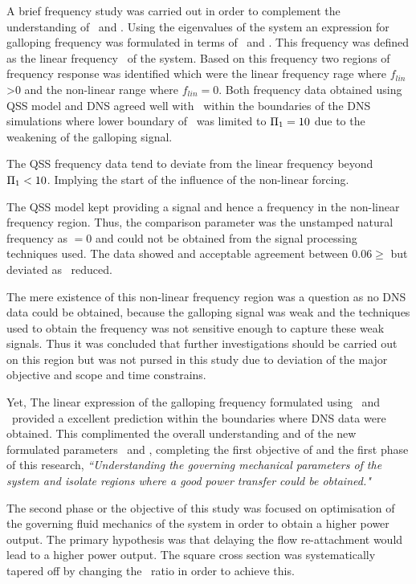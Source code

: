  A brief frequency study was carried out in order to complement the understanding of \massstiff\ and \massdamp. Using the eigenvalues of the system an expression for galloping frequency was formulated in terms of \massstiff\ and \massdamp. This frequency was defined as the linear frequency \freqlin\ of the system. Based on this frequency two regions of frequency response was identified which were the linear frequency rage where $f_{lin}$>0 and the non-linear range where $f_{lin}=0$. Both frequency data obtained using QSS model and DNS agreed well with \freqlin\ within the boundaries of the DNS simulations where lower boundary of \massstiff\ was limited to $\Pi_1=10$ due to the weakening of the galloping signal.
 
 The QSS frequency data tend to deviate from the linear frequency beyond $\Pi_1<10$. Implying the start of the influence of the non-linear forcing. 
 
 The QSS model kept providing a signal and hence a frequency in the non-linear frequency region. Thus, the comparison parameter was the unstamped natural frequency as \freqlin$=0$ and \freqdns could not be obtained from the signal processing techniques used. The data showed and acceptable agreement between $0.06\geq$ but deviated as \massstiff\ reduced.
 
 The mere existence of this non-linear frequency region was a question as no DNS data could be obtained, because the galloping signal was weak and the techniques used to obtain the  frequency was not sensitive enough to capture these weak signals. Thus it was concluded that further investigations should be carried out on this region but was not pursed in this study due to deviation of the major objective and scope and time constrains.
 
 Yet, The linear expression of the galloping frequency formulated using \massstiff\ and \massdamp\ provided a excellent prediction within the boundaries where DNS data were obtained. This complimented the overall understanding and of the new formulated parameters \massstiff\ and \massdamp, completing the first objective of and the first phase of this research, \emph{``Understanding the governing mechanical parameters of the system and isolate regions where a good power transfer could be obtained."}
 
 The second phase or the objective of this study was focused on optimisation of the governing fluid mechanics of the system in order to obtain a higher power output. The primary hypothesis was that delaying the flow re-attachment would lead to a higher power output. The square cross section was systematically tapered off by changing the \ratio\ ratio in order to achieve this.
 

